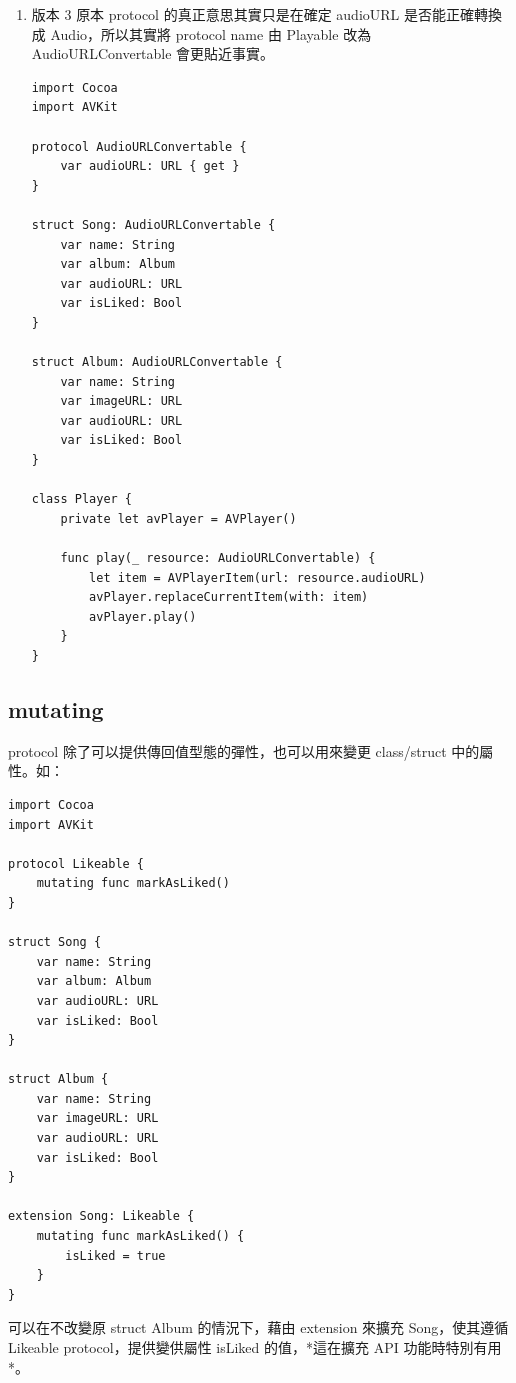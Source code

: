 \documentclass[a4paper,12pt]{article}
\begin{document}
\begin{enumerate}
\item 版本 3
\label{sec:org8760076}
原本 protocol 的真正意思其實只是在確定 audioURL 是否能正確轉換成 Audio，所以其實將 protocol name 由 Playable 改為 AudioURLConvertable 會更貼近事實。\\
\lstset{breaklines=true,language=swift,label= ,caption= ,captionpos=b,firstnumber=1,numbers=left}
\begin{lstlisting}
import Cocoa
import AVKit

protocol AudioURLConvertable {
    var audioURL: URL { get }
}

struct Song: AudioURLConvertable {
    var name: String
    var album: Album
    var audioURL: URL
    var isLiked: Bool
}

struct Album: AudioURLConvertable {
    var name: String
    var imageURL: URL
    var audioURL: URL
    var isLiked: Bool
}

class Player {
    private let avPlayer = AVPlayer()

    func play(_ resource: AudioURLConvertable) {
        let item = AVPlayerItem(url: resource.audioURL)
        avPlayer.replaceCurrentItem(with: item)
        avPlayer.play()
    }
}

\end{lstlisting}
\end{enumerate}

\subsection{mutating}
\label{sec:org21bca8e}
protocol 除了可以提供傳回值型態的彈性，也可以用來變更 class/struct 中的屬性。如：\\
\lstset{breaklines=true,language=swift,label= ,caption= ,captionpos=b,firstnumber=1,numbers=left}
\begin{lstlisting}
import Cocoa
import AVKit

protocol Likeable {
    mutating func markAsLiked()
}

struct Song {
    var name: String
    var album: Album
    var audioURL: URL
    var isLiked: Bool
}

struct Album {
    var name: String
    var imageURL: URL
    var audioURL: URL
    var isLiked: Bool
}

extension Song: Likeable {
    mutating func markAsLiked() {
        isLiked = true
    }
}
\end{lstlisting}

可以在不改變原 struct Album 的情況下，藉由 extension 來擴充 Song，使其遵循 Likeable protocol，提供變供屬性 isLiked 的值，*這在擴充 API 功能時特別有用*。\\
\end{document}
